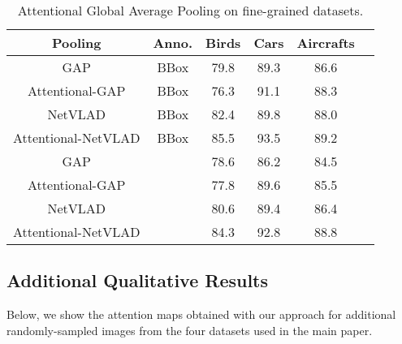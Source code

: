 \documentclass{bmvc2k}
\begin{document}
\begin{table}[h]
	\small
	\centering
	\begin{tabular}{|c|c|c|c|c|c|}
		\hline
		Pooling             & Anno.      & Birds & Cars & Aircrafts\\
		\hline
		GAP              & BBox       & 79.8 & 89.3 & 86.6  \\     
		Attentional-GAP  & BBox       & 76.3 & 91.1 & 88.3   \\
				NetVLAD             & BBox       & 82.4 & 89.8 & 88.0   \\     
		Attentional-NetVLAD  & BBox   & 85.5 & 93.5 &89.2    \\          
			\hline
		GAP              &            & 78.6 & 86.2 & 84.5  \\     
		Attentional-GAP  &            & 77.8 & 89.6 & 85.5   \\  
		NetVLAD             &            & 80.6 & 89.4 & 86.4  \\     
		Attentional-NetVLAD  &        & 84.3 & 92.8 & 88.8   \\        
		\hline
		
	\end{tabular}
	\vspace{0.1in}
	\caption{\label{tab:GAP_results} Attentional Global Average Pooling on fine-grained datasets.}
\end{table}\newpage\subsection{Additional Qualitative Results}
Below, we show the attention maps obtained with our approach for additional randomly-sampled images from the four datasets used in the main paper.
\end{document}
